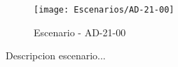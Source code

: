 \begin{figure}[H]
\centering
\texttt{[image: Escenarios/AD-21-00]}
\caption{Escenario - AD-21-00}
\label{fig:AD-21-00}
\end{figure}

Descripcion escenario...
\clearpage
